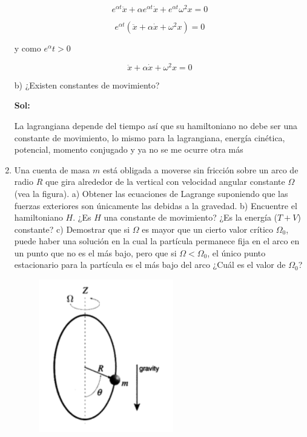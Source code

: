 \documentclass[12pt,a4paper]{article}
\begin{document}
\begin{enumerate}
        \begin{equation*}
            e^{\alpha t} \ddot{x} + \alpha e^{\alpha t} \dot{x} + e^{\alpha t} \omega^2 x = 0
        \end{equation*}
        
        \begin{equation*}
            e^{\alpha t}( \ddot{x} + \alpha \dot{x} +  \omega^2 x)= 0
        \end{equation*}
        
        y como $e^{\alpha} t > 0$
        
        \begin{equation*}
            \ddot{x} + \alpha \dot{x} +  \omega^2 x= 0
        \end{equation*}
        
        
        b) ¿Existen constantes de movimiento?
        
        \textbf{Sol:}
        
        La lagrangiana depende del tiempo así que su hamiltoniano no debe ser una constante de movimiento, lo mismo para la lagrangiana, energía cinética, potencial, momento conjugado y ya no se me ocurre otra más
        
        
        
        
        
        
        
        \item Una cuenta de masa $m$  está obligada a moverse sin fricción sobre un arco de radio $R$ que gira alrededor de la vertical con velocidad angular constante $\Omega$ (vea la figura). a) Obtener las ecuaciones de Lagrange suponiendo que las fuerzas exteriores son únicamente las debidas a la gravedad. b) Encuentre el hamiltoniano $H$. ¿Es $H$ una constante de movimiento? ¿Es la energía ($T+V$) constante? c) Demostrar que si $\Omega$ es mayor que un cierto valor crítico $\Omega_0$, puede haber una solución en la cual la partícula permanece fija en el arco en un punto que no es el más bajo, pero que si $\Omega < \Omega_0$, el único punto estacionario para la partícula es el más bajo del arco ¿Cuál es el valor de $\Omega_0$?
        
        \begin{figure}[h!]
            \centering
            \includegraphics{3.PNG}
        \end{figure}
        

\end{enumerate}
\end{document}
